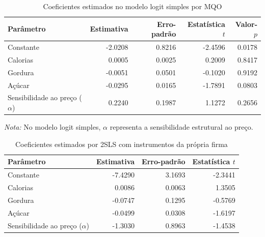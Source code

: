 


\begingroup
\begin{table}[H]
\centering
\caption{Coeficientes estimados no modelo logit simples por MQO}
\label{tab:coef-logit-simples}
\small
\begin{tabular}{lrrrr}
\toprule
Parâmetro & Estimativa & Erro-padrão & Estatística $t$ & Valor-$p$ \\
\midrule
Constante & -2.0208 & 0.8216 & -2.4596 & 0.0178 \\
Calorias & 0.0005 & 0.0025 & 0.2009 & 0.8417 \\
Gordura & -0.0051 & 0.0501 & -0.1020 & 0.9192 \\
Açúcar & -0.0295 & 0.0165 & -1.7891 & 0.0803 \\
Sensibilidade ao preço ($\alpha$) & 0.2240 & 0.1987 & 1.1272 & 0.2656 \\
\bottomrule
\end{tabular}

\vspace{0.3em}
\footnotesize
\textit{Nota:} No modelo logit simples, $\alpha$ representa a sensibilidade estrutural ao preço.
\end{table}
\endgroup


\begingroup
\begin{table}[H]
\centering
\caption{Coeficientes estimados por 2SLS com instrumentos da própria firma}
\label{tab:coef-2sls-propria-firma}
\small
\begin{tabular}{lrrr}
\toprule
Parâmetro & Estimativa & Erro-padrão & Estatística $t$ \\
\midrule
Constante & -7.4290 & 3.1693 & -2.3441 \\
Calorias & 0.0086 & 0.0063 & 1.3505 \\
Gordura & -0.0747 & 0.1295 & -0.5769 \\
Açúcar & -0.0499 & 0.0308 & -1.6197 \\
Sensibilidade ao preço ($\alpha$) & -1.3030 & 0.8963 & -1.4538 \\
\bottomrule
\end{tabular}
\end{table}
\endgroup

